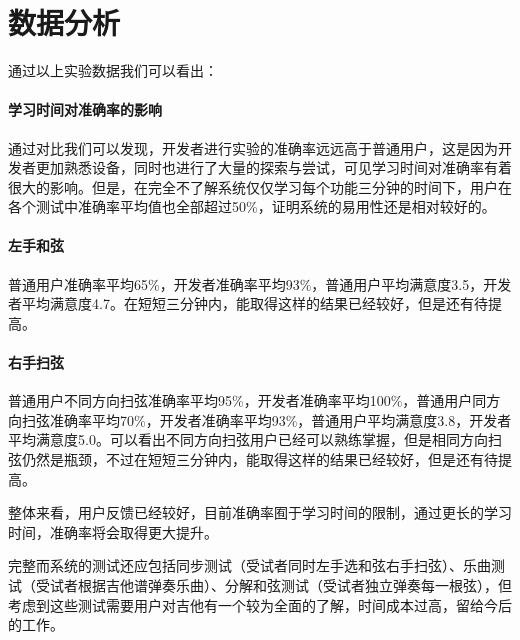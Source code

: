     \section{数据分析}

        通过以上实验数据我们可以看出：

        \paragraph{学习时间对准确率的影响} 通过对比我们可以发现，开发者进行实验的准确率远远高于普通用户，这是因为开发者更加熟悉设备，同时也进行了大量的探索与尝试，可见学习时间对准确率有着很大的影响。但是，在完全不了解系统仅仅学习每个功能三分钟的时间下，用户在各个测试中准确率平均值也全部超过50\%，证明系统的易用性还是相对较好的。

        \paragraph{左手和弦} 普通用户准确率平均65\%，开发者准确率平均93\%，普通用户平均满意度3.5，开发者平均满意度4.7。在短短三分钟内，能取得这样的结果已经较好，但是还有待提高。

        \paragraph{右手扫弦} 普通用户不同方向扫弦准确率平均95\%，开发者准确率平均100\%，普通用户同方向扫弦准确率平均70\%，开发者准确率平均93\%，普通用户平均满意度3.8，开发者平均满意度5.0。可以看出不同方向扫弦用户已经可以熟练掌握，但是相同方向扫弦仍然是瓶颈，不过在短短三分钟内，能取得这样的结果已经较好，但是还有待提高。

        整体来看，用户反馈已经较好，目前准确率囿于学习时间的限制，通过更长的学习时间，准确率将会取得更大提升。

        完整而系统的测试还应包括同步测试（受试者同时左手选和弦右手扫弦）、乐曲测试（受试者根据吉他谱弹奏乐曲）、分解和弦测试（受试者独立弹奏每一根弦），但考虑到这些测试需要用户对吉他有一个较为全面的了解，时间成本过高，留给今后的工作。
